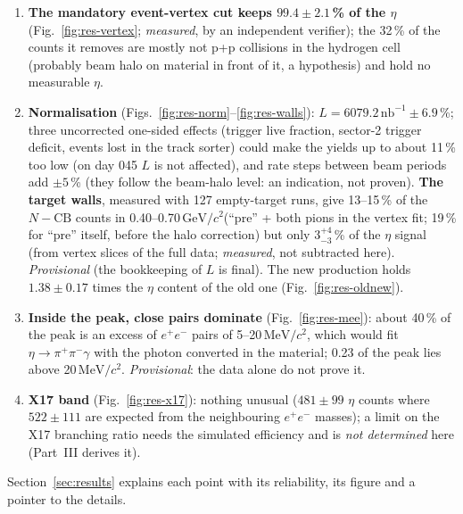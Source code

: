 \documentclass[11pt,a4paper]{article}
\newcommand{\ee}{\ensuremath{e^{+}e^{-}}\xspace}
\newcommand{\GeVcc}{\ensuremath{\mathrm{GeV}/c^{2}}\xspace}
\newcommand{\MeVcc}{\ensuremath{\mathrm{MeV}/c^{2}}\xspace}
\begin{document}
{{\begin{enumerate}
      from 12.7 to 14.1, the same gain as the best blind data-tuned rule ($+1.35$ against $+1.36$); the vertex cuts do most of the work, an
      opening-angle cut never helps. \emph{Provisional} (a recommendation open for review).
\item \textbf{The mandatory event-vertex cut keeps $99.4\pm2.1$\,\% of the $\eta$} (Fig.~\ref{fig:res-vertex}; \emph{measured}, by an independent verifier); the 32\,\% of the
      counts it removes are mostly not p+p collisions in the hydrogen cell (probably beam halo on material in front of it, a hypothesis) and hold no measurable $\eta$.
\item \textbf{Normalisation} (Figs.~\ref{fig:res-norm}--\ref{fig:res-walls}): $L=6079.2\,\mathrm{nb}^{-1}\pm6.9$\,\%; three uncorrected one-sided effects (trigger live fraction, sector-2 trigger
      deficit, events lost in the track sorter) could make the yields up to about 11\,\% too low (on day 045 $L$ is not affected), and rate steps between beam
      periods add $\pm5$\,\% (they follow the beam-halo level: an indication, not proven). \textbf{The target walls}, measured with 127 empty-target runs,
      give 13--15\,\% of the $N-\mathrm{CB}$ counts in 0.40--0.70\,\GeVcc (``pre'' + both pions in the vertex fit; 19\,\% for ``pre'' itself,
      before the halo correction) but only
      $3^{+4}_{-3}$\,\% of the $\eta$ signal (from vertex slices of the full data; \emph{measured}, not subtracted here).
      \emph{Provisional} (the bookkeeping of $L$ is final). The new production holds $1.38\pm0.17$ times the $\eta$
      content of the old one (Fig.~\ref{fig:res-oldnew}).
\item \textbf{Inside the peak, close pairs dominate} (Fig.~\ref{fig:res-mee}): about 40\,\% of the peak is an excess of \ee pairs of 5--20\,\MeVcc, which would fit
      $\eta\to\pi^+\pi^-\gamma$ with the photon converted in the material; 0.23 of the peak lies above 20\,\MeVcc. \emph{Provisional}: the data
      alone do not prove it.
\item \textbf{X17 band} (Fig.~\ref{fig:res-x17}): nothing unusual ($481\pm99$ $\eta$ counts where $522\pm111$ are expected from the neighbouring \ee masses); a limit on
      the X17 branching ratio needs the simulated efficiency and is \emph{not determined} here (Part~III derives it).
\end{enumerate}
Section~\ref{sec:results} explains each point with its reliability, its figure and a pointer to the details.}}

\end{document}
